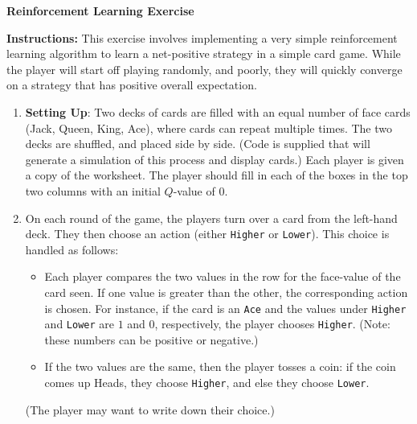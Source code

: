 \documentclass[leqno,11pt]{article}
\begin{document}
\begin{center}
{\large
	\textbf{Reinforcement Learning Exercise}
}

\hrulefill
\end{center}

\noindent
\textbf{Instructions:}  This exercise involves implementing a very simple reinforcement learning algorithm to
learn a net-positive strategy in a simple card game.  While the player will start off playing randomly, and
poorly, they will quickly converge on a strategy that has positive overall expectation.


\begin{enumerate}
	\item \textbf{Setting Up}: Two decks of cards are filled with an equal number of face cards (Jack,
		Queen, King, Ace), where cards can repeat multiple times.  The two decks are shuffled, and
		placed side by side.  (Code is supplied that will generate a simulation of this process and
		display cards.) Each player is given a copy of the worksheet.  The player should fill in each of
		the boxes in the top two columns with an initial $Q$-value of $0$.
		
	\item On each round of the game, the players turn over a card from the left-hand deck. They then choose
		an action (either \texttt{Higher} or \texttt{Lower}).  This choice is handled as follows:
		\begin{itemize}
			\item Each player compares the two values in the row for the face-value of the card seen.
				If one value is greater than the other, the corresponding action is chosen.
				For instance, if the card is an \texttt{Ace} and the values under
				\texttt{Higher} and \texttt{Lower} are $1$ and $0$, respectively, the player
				chooses \texttt{Higher}.  (Note: these numbers can be positive or negative.)
			\item If the two values are the same, then the player tosses a coin: if the coin comes
				up Heads, they choose \texttt{Higher}, and else they choose \texttt{Lower}.
		\end{itemize}
		(The player may want to write down their choice.)


\end{enumerate}
\end{document}
